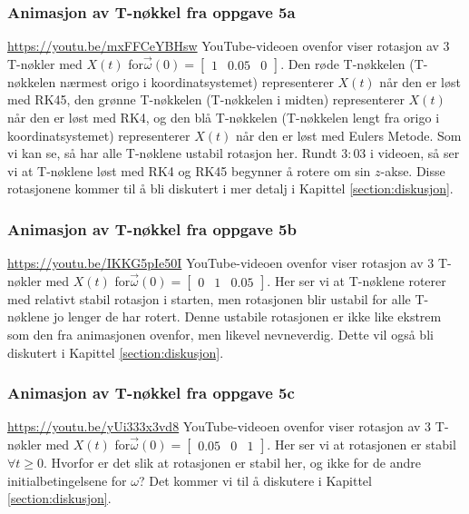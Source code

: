 \subsubsection{Animasjon av T-nøkkel fra oppgave 5a}
\label{subseq:oppgavea}
\href{https://youtu.be/mxFFCeYBHsw}{https://youtu.be/mxFFCeYBHsw}\newline\newline 
YouTube-videoen ovenfor viser rotasjon av $3$ T-nøkler med $X(t)$ for\newline $\vec{\omega}(0)=\begin{bmatrix}1&0.05&0\end{bmatrix}.$ Den røde T-nøkkelen (T-nøkkelen nærmest origo i koordinatsystemet) representerer $X(t)$ når den er løst med RK45, den grønne T-nøkkelen (T-nøkkelen i midten) representerer $X(t)$ når den er løst med RK4, og den blå T-nøkkelen (T-nøkkelen lengt fra origo i koordinatsystemet) representerer $X(t)$ når den er løst med Eulers Metode. Som vi kan se, så har alle T-nøklene ustabil rotasjon her. Rundt $3:03$ i videoen, så ser vi at T-nøklene løst med RK4 og RK45 begynner å rotere om sin $z$-akse. Disse rotasjonene kommer til å bli diskutert i mer detalj i Kapittel \ref{section:diskusjon}.

\subsubsection{Animasjon av T-nøkkel fra oppgave 5b}
\label{subseq:oppgaveb}
\href{https://youtu.be/IKKG5pIe50I}{https://youtu.be/IKKG5pIe50I}\newline\newline
YouTube-videoen ovenfor viser rotasjon av $3$ T-nøkler med $X(t)$ for\newline $\vec{\omega}(0) = \begin{bmatrix}0 & 1 & 0.05 \end{bmatrix}$. Her ser vi at T-nøklene roterer med relativt stabil rotasjon i starten, men rotasjonen blir ustabil for alle T-nøklene jo lenger de har rotert. Denne ustabile rotasjonen er ikke like ekstrem som den fra animasjonen ovenfor, men likevel nevneverdig. Dette vil også bli diskutert i Kapittel \ref{section:diskusjon}.

\subsubsection{Animasjon av T-nøkkel fra oppgave 5c}
\label{subseq:oppgavec}
\href{https://youtu.be/yUi333x3vd8}{https://youtu.be/yUi333x3vd8}\newline\newline
YouTube-videoen ovenfor viser rotasjon av $3$ T-nøkler med $X(t)$ for\newline $\vec{\omega}(0) = \begin{bmatrix}0.05 & 0 & 1 \end{bmatrix}$. Her ser vi at rotasjonen er stabil $\forall t\geq 0.$ Hvorfor er det slik at rotasjonen er stabil her, og ikke for de andre initialbetingelsene for $\omega$? Det kommer vi til å diskutere i Kapittel \ref{section:diskusjon}. 